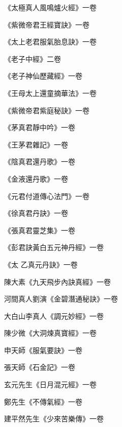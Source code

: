 \begin{pinyinscope}
 《太極真人風鳴爐火經》一卷



 《紫微帝君王經寶訣》一卷



 《太上老君服氣胎息訣》一卷



 《老子中經》二卷



 《老子神仙歷藏經》一卷



 《王母太上還童摘華法》一卷



 《紫微帝君紫庭秘訣》一卷



 《茅真君靜中吟》一卷



 《王茅君雜記》一卷



 《陰真君還丹歌》一卷



 《金液還丹歌》一卷



 《元君付道傳心法門》一卷



 《徐真君丹訣》一卷



 《張真君靈芝集》一卷



 《彭君訣黃白五元神丹經》一卷



 《太
 乙真元丹訣》一卷



 陳大素《九天飛步內訣真經》一卷



 河間真人劉演《金碧潛通秘訣》一卷



 大白山李真人《調元妙經》一卷



 陳少微《大洞煉真寶經》一卷



 申天師《服氣要訣》一卷



 張天師《石金記》一卷



 玄元先生《日月混元經》一卷



 鄭先生《不傳氣經》一卷



 建平然先生《少來苦樂傳》一卷




\end{pinyinscope}
